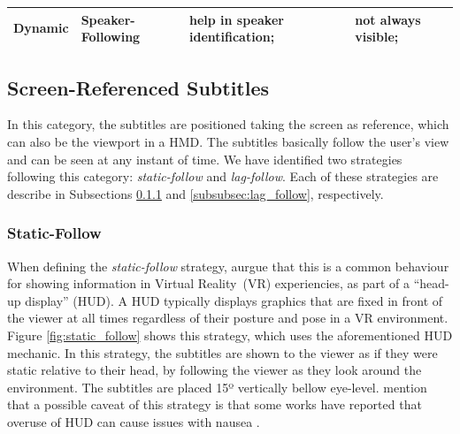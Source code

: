 \begin{table}[!ht]
\begin{tabular}{@{}llll@{}}
\textbf{Dynamic}                                                & Speaker-Following  & help in speaker identification;                                                                        & not always visible;                                                                                            \\ \bottomrule
\end{tabular}
\end{table}
\endgroup

\subsection{Screen-Referenced Subtitles}
\label{subsec:screen_referenced}
In this category, the subtitles are positioned taking the screen as reference, which can also be the viewport in a HMD. The subtitles basically follow the user's view and can be seen at any instant of time. We have identified two strategies following this category: \emph{static-follow} and \emph{lag-follow}. Each of these strategies are describe in Subsections \ref{subsubsec:static_follow} and \ref{subsubsec:lag_follow}, respectively.

\subsubsection{Static-Follow}
\label{subsubsec:static_follow}

When defining the \emph{static-follow} strategy,  aurgue that this is a common behaviour for showing information in Virtual Reality~(VR) experiencies, as part of a ``head-up display'' (HUD). A HUD typically displays graphics that are fixed in front of the viewer at all times regardless of their posture and pose in a VR environment. Figure \ref{fig:static_follow} shows this strategy, which uses the aforementioned HUD mechanic. In this strategy, the subtitles are shown to the viewer as if they were static relative to their head, by following the viewer as they look around the environment. The subtitles are placed 15º vertically bellow eye-level.  mention that a possible caveat of this strategy is that some works have reported that overuse of HUD can cause issues with nausea \cite{laviola2000discussion, sharples2008virtual}.

